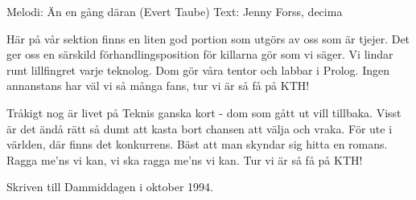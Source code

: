 \begin{song}

\begin{songmeta}
Melodi: Än en gång däran (Evert Taube)
Text: Jenny Forss, decima
\end{songmeta}

\begin{songtext}
Här på vår sektion finns en liten god portion
som utgörs av oss som är tjejer.
Det ger oss en särskild förhandlingsposition
för killarna gör som vi säger.
Vi lindar runt lillfingret varje teknolog.
Dom gör våra tentor och labbar i Prolog.
Ingen annanstans
har väl vi så många fans,
tur vi är så få på KTH!

Tråkigt nog är livet på Teknis ganska kort
- dom som gått ut vill tillbaka.
Visst är det ändå rätt så dumt att kasta bort
chansen att välja och vraka.
För ute i världen, där finns det konkurrens.
Bäst att man skyndar sig hitta en romans.
Ragga me'ns vi kan,
vi ska ragga me'ns vi kan.
Tur vi är så få på KTH!
\end{songtext}

\begin{songnotes}
Skriven till Dammiddagen i oktober 1994.
\end{songnotes}

\end{song}
